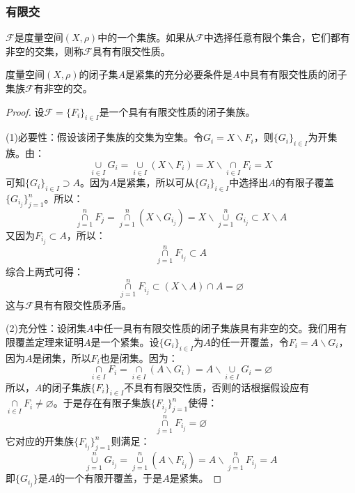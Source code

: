 \subsubsection{有限交}
\begin{definition}
	$\mathscr{F}$是度量空间$(X,\rho)$中的一个集族。如果从$\mathscr{F}$中选择任意有限个集合，它们都有非空的交集，则称$\mathscr{F}$具有有限交性质。
\end{definition}
\begin{theorem}
	度量空间$(X,\rho)$的闭子集$A$是紧集的充分必要条件是$A$中具有有限交性质的闭子集族$\mathscr{F}$有非空的交。
\end{theorem}
\begin{proof}
	设$\mathscr{F}=\{F_i\}_{i\in I}$是一个具有有限交性质的闭子集族。\par
	(1)必要性：假设该闭子集族的交集为空集。令$G_i=X\backslash F_i$，则$\{G_i\}_{i\in I}$为开集族。由：
	\begin{equation*}
		\underset{i\in I}{\overset{}{\cup}}G_i=\underset{i\in I}{\overset{}{\cup}}(X\backslash F_i)=X\backslash \underset{i\in I}{\overset{}{\cap}}F_i=X
	\end{equation*}
	可知$\{G_i\}_{i\in I}\supset A$。因为$A$是紧集，所以可从$\{G_i\}_{i\in I}$中选择出$A$的有限子覆盖$\{G_{i_j}\}_{j=1}^n$。所以：
	\begin{equation*}
		\underset{j=1}{\overset{n}{\cap}}F_{j}=\underset{j=1}{\overset{n}{\cap}}(X\backslash G_{i_j})=X\backslash\underset{j=1}{\overset{n}{\cup}}G_{i_j}\subset X\backslash A
	\end{equation*}
	又因为$F_{i_j}\subset A$，所以：
	\begin{equation*}
		\underset{j=1}{\overset{n}{\cap}}F_{i_j}\subset A
	\end{equation*}
	综合上两式可得：
	\begin{equation*}
		\underset{j=1}{\overset{n}{\cap}}F_{i_j}\subset(X\backslash A)\cap A=\varnothing
	\end{equation*}
	这与$\mathscr{F}$具有有限交性质矛盾。\par
	(2)充分性：设闭集$A$中任一具有有限交性质的闭子集族具有非空的交。我们用有限覆盖定理来证明$A$是一个紧集。设$\{G_i\}_{i\in I}$为$A$的任一开覆盖，令$F_i=A\backslash G_i$，因为$A$是闭集，所以$F_i$也是闭集。因为：
	\begin{equation*}
		\underset{i\in I}{\overset{}{\cap}}F_i=\underset{i\in I}{\overset{}{\cap}}(A\backslash G_i)=A\backslash\underset{i\in I}{\overset{}{\cup}}G_i=\varnothing
	\end{equation*}
	所以，$A$的闭子集族$\{F_i\}_{i\in I}$不具有有限交性质，否则的话根据假设应有$\underset{i\in I}{\overset{}{\cap}}F_i\ne\varnothing$。于是存在有限子集族$\{F_{i_j}\}_{j=1}^n$使得：
	\begin{equation*}
		\underset{j=1}{\overset{n}{\cap}}F_{i_j}=\varnothing
	\end{equation*}
	它对应的开集族$\{F_{i_j}\}_{j=1}^n$则满足：
	\begin{equation*}
		\underset{j=1}{\overset{n}{\cup}}G_{i_j}=\underset{j=1}{\overset{n}{\cup}}(A\backslash F_{i_j})=A\backslash\underset{j=1}{\overset{n}{\cap}}F_{i_j}=A
	\end{equation*}
	即$\{G_{i_j}\}$是$A$的一个有限开覆盖，于是$A$是紧集。
\end{proof}

